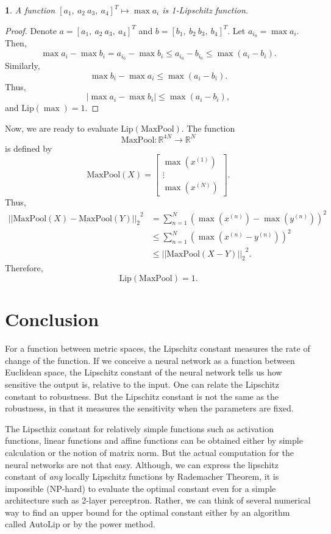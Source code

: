 \documentclass[12pt]{report}
\numberwithin{figure}{chapter}
\theoremstyle{plain}
\theoremstyle{definition}
\theoremstyle{corollary}
\theoremstyle{definition}
\theoremstyle{plain}
\theoremstyle{definition}
\theoremstyle{plain}
\newtheorem{lemma}[theorem]{\protect\lemmaname}
\providecommand{\lemmaname}{Lemma}
\newcommand\lip{\ensuremath{\text{Lip}}}
\begin{document}
\begin{lemma}\label{lemm:maxs_1_lipschitz}
A function \([a_1,\:a_2\:a_3,\:a_4]^T\mapsto\max a_i\) is 1-Lipschitz function.
\end{lemma}
\begin{proof}
Denote \(a=[a_1,\:a_2\:a_3,\:a_4]^T\) and \(b=[b_1,\:b_2\:b_3,\:b_4]^T\).
Let \(a_{i_0}=\max a_i\).
Then,
\[\max a_i-\max b_i=a_{i_0}-\max b_i\le a_{i_0}-b_{i_0}\le\max (a_i-b_i).\]
Similarly, \[\max b_i-\max a_i\le\max (a_i-b_i).\]
Thus,
\[\left|\max a_i-\max b_i\right|\le\max (a_i-b_i),\]
and \(\lip(\max)=1\).
\end{proof}

Now, we are ready to evaluate \(\lip(\text{MaxPool})\).
The function \[\text{MaxPool}:\mathbb R^{4N}\to\mathbb R^N\] is defined by
\[\text{MaxPool}(X)=\begin{bmatrix}\max \left(x^{(1)}\right)\\\vdots\\\max \left(x^{(N)}\right)\end{bmatrix}.\]
Thus,
\begin{align*}
{\left|\left|\text{MaxPool}(X)-\text{MaxPool}(Y)\right|\right|_2}^2
&=\sum_{n=1}^N\left(\max\left(x^{(n)}\right)-\max\left(y^{(n)}\right)\right)^2\\
&\le\sum_{n=1}^N\left(\max\left(x^{(n)}-y^{(n)}\right)\right)^2\\
&{\le\left|\left|\text{MaxPool}(X-Y)\right|\right|_2}^2.
\end{align*}
Therefore,
\[\lip(\text{MaxPool})=1.\]

\chapter{Conclusion}
For a function between metric spaces, the Lipschitz constant measures the rate of change of the function.
If we conceive a neural network as a function between Euclidean space, the Lipschitz constant of the neural network tells us how sensitive the output is, relative to the input.
One can relate the Lipschitz constant to robustness.
But the Lipschitz constant is not the same as the robustness, in that it measures the sensitivity when the parameters are fixed.

The Lipscthiz constant for relatively simple functions such as activation functions, linear functions and affine functions can be obtained either by simple calculation or the notion of matrix norm.
But the actual computation for the neural networks are not that easy.
Although, we can express the lipschitz constant of \emph{any} locally Lipschitz functions by Rademacher Theorem, it is impossible (NP-hard) to evaluate the optimal constant even for a simple architecture such as 2-layer perceptron.
Rather, we can think of several numerical way to find an upper bound for the optimal constant either by an algorithm called AutoLip or by the power method.
\end{document}
